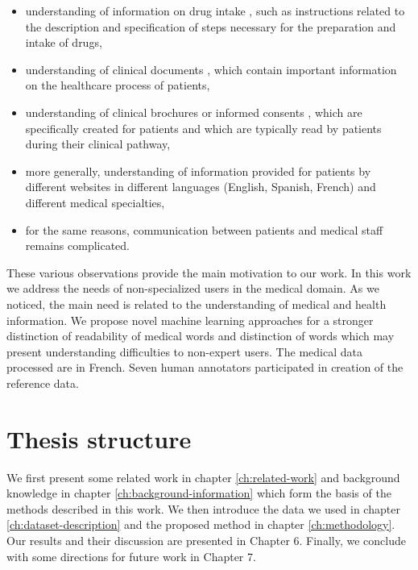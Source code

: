 \begin{itemize}
    \item  understanding of information on drug intake \citep{VanderStichele-WILEY1999,Patel-IJMI2002}, such as instructions related to the description and specification of steps necessary for the preparation and intake of drugs,
    
    \item  understanding of clinical documents \citep{Zeng-MEDINFO2007}, which contain important information on the healthcare process of patients,
    
    \item  understanding of clinical brochures or informed consents \citep{Williams-JAMA1995}, which are specifically created for patients and which are typically read by patients during their clinical pathway,
    
    \item  more generally, understanding of information provided for patients by different websites \citep{Oregon-2008,Brigo-EB2015} in different languages (English, Spanish, French) and different medical specialties,
    
    \item  for the same reasons, communication between patients and medical staff \citep{Jucks-HC2007,Tran-EC2009} remains complicated.
\end{itemize}
These various observations provide the main motivation to our work. In this work we address the needs of non-specialized users in the medical domain. As we noticed, the main need is related to the understanding of medical and health information. We propose novel machine learning approaches for a stronger distinction of readability of medical words and distinction of words which may present understanding difficulties to non-expert users. The medical data processed are in French. Seven human annotators participated in creation of the reference data.


\section{Thesis structure}
We first present some related work in chapter \ref{ch:related-work} and background knowledge in chapter \ref{ch:background-information} which form the basis of the methods described in this work. We then introduce the data we used in chapter \ref{ch:dataset-description} and the proposed method in chapter \ref{ch:methodology}. Our results and their discussion are presented in Chapter 6. Finally, we conclude with some directions for future work in Chapter 7.
